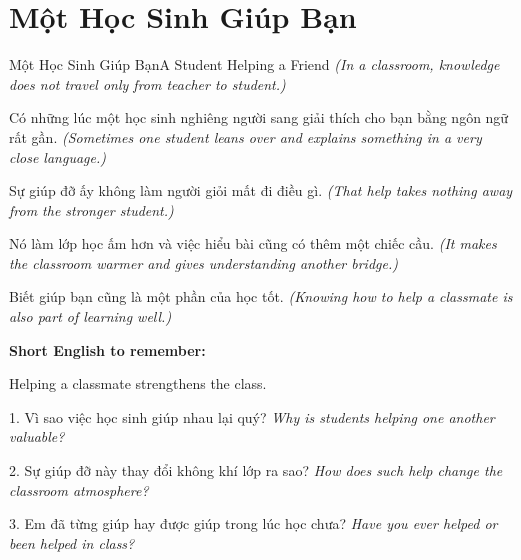 \section{Một Học Sinh Giúp Bạn}
\begin{truyen}{Một Học Sinh Giúp Bạn}{A Student Helping a Friend}
\textit{(In a classroom, knowledge does not travel only from teacher to student.)}

Có những lúc một học sinh nghiêng người sang giải thích cho bạn bằng ngôn ngữ rất gần.
\textit{(Sometimes one student leans over and explains something in a very close language.)}

Sự giúp đỡ ấy không làm người giỏi mất đi điều gì.
\textit{(That help takes nothing away from the stronger student.)}

Nó làm lớp học ấm hơn và việc hiểu bài cũng có thêm một chiếc cầu.
\textit{(It makes the classroom warmer and gives understanding another bridge.)}
\end{truyen}

\begin{baihoc}
Biết giúp bạn cũng là một phần của học tốt.
\textit{(Knowing how to help a classmate is also part of learning well.)}
\end{baihoc}

\begin{ghinhoanh}
\textbf{Short English to remember:}

Helping a classmate strengthens the class.

\end{ghinhoanh}

\begin{tuhocnhanh}
1. Vì sao việc học sinh giúp nhau lại quý? \textit{Why is students helping one another valuable?}

2. Sự giúp đỡ này thay đổi không khí lớp ra sao? \textit{How does such help change the classroom atmosphere?}

3. Em đã từng giúp hay được giúp trong lúc học chưa? \textit{Have you ever helped or been helped in class?}
\end{tuhocnhanh}
\ngancach

